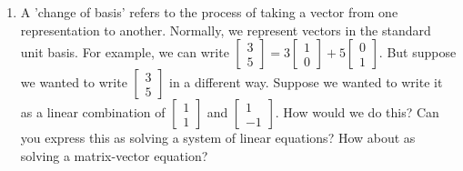 


\begin{enumerate}
\item A 'change of basis' refers to the process of taking a vector from one representation to another. Normally, we represent vectors in the standard unit basis. For example, we can write $\begin{bmatrix}3 \\ 5\end{bmatrix} = 3\begin{bmatrix}1 \\ 0\end{bmatrix} + 5\begin{bmatrix}0 \\ 1\end{bmatrix}$. But suppose we wanted to write $\begin{bmatrix}3 \\ 5\end{bmatrix}$ in a different way. Suppose we wanted to write it as a linear combination of $\begin{bmatrix}1 \\ 1\end{bmatrix}$ and $\begin{bmatrix}1 \\ -1\end{bmatrix}$. How would we do this? Can you express this as solving a system of linear equations? How about as solving a matrix-vector equation?

\end{enumerate}
